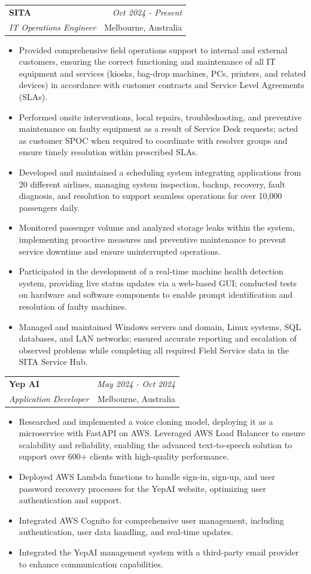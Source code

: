 \documentclass[a4paper,11pt]{article}
\makeatletter
\newcommand{\resumeSubheading}[4]{
\vspace{0.5mm}\item
    \begin{tabular*}{0.98\textwidth}[t]{l@{\extracolsep{\fill}}r}
        \textbf{#1} & \textit{\footnotesize{#4}} \\
        \textit{\footnotesize{#3}} & \footnotesize{#2}\\
    \end{tabular*}
    \vspace{-2.4mm}
}
\newcommand{\resumeItemListStart}{\begin{itemize}[leftmargin=*,labelsep=1mm,itemsep=0.5mm]}
\newcommand{\resumeItemListEnd}{\end{itemize}\vspace{-2mm}}
\makeatother
\begin{document}
\resumeSubheading
    {SITA}{Melbourne, Australia}
    {IT Operations Engineer}{Oct 2024 - Present}
\resumeItemListStart
    \item Provided comprehensive field operations support to internal and external customers, ensuring the correct functioning and maintenance of all IT equipment and services (kiosks, bag-drop machines, PCs, printers, and related devices) in accordance with customer contracts and Service Level Agreements (SLAs).
    \item Performed onsite interventions, local repairs, troubleshooting, and preventive maintenance on faulty equipment as a result of Service Desk requests; acted as customer SPOC when required to coordinate with resolver groups and ensure timely resolution within prescribed SLAs.
    \item Developed and maintained a scheduling system integrating applications from 20 different airlines, managing system inspection, backup, recovery, fault diagnosis, and resolution to support seamless operations for over 10,000 passengers daily.
    \item Monitored passenger volume and analyzed storage leaks within the system, implementing proactive measures and preventive maintenance to prevent service downtime and ensure uninterrupted operations.
    \item Participated in the development of a real-time machine health detection system, providing live status updates via a web-based GUI; conducted tests on hardware and software components to enable prompt identification and resolution of faulty machines.
    \item Managed and maintained Windows servers and domain, Linux systems, SQL databases, and LAN networks; ensured accurate reporting and escalation of observed problems while completing all required Field Service data in the SITA Service Hub.
\resumeItemListEnd

\resumeSubheading
    {Yep AI}{Melbourne, Australia}
    {Application Developer}{May 2024 - Oct 2024}
\resumeItemListStart
    \item Researched and implemented a voice cloning model, deploying it as a microservice with FastAPI on AWS. Leveraged AWS Load Balancer to ensure scalability and reliability, enabling the advanced text-to-speech solution to support over 600+ clients with high-quality performance.
    \item Deployed AWS Lambda functions to handle sign-in, sign-up, and user password recovery processes for the YepAI website, optimizing user authentication and support.
    \item Integrated AWS Cognito for comprehensive user management, including authentication, user data handling, and real-time updates.
    \item Integrated the YepAI management system with a third-party email provider to enhance communication capabilities.
\resumeItemListEnd
\end{document}

